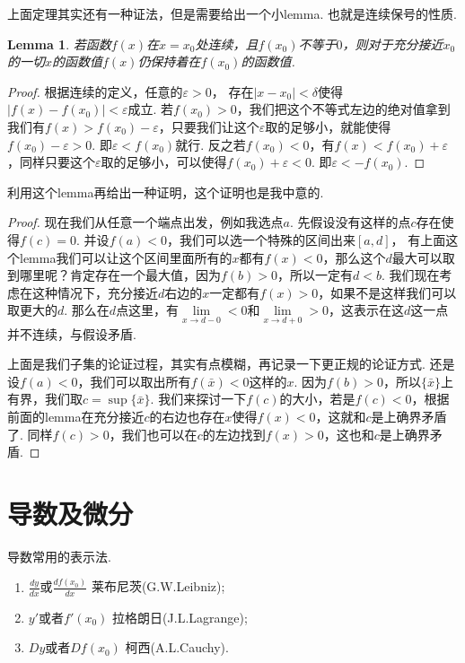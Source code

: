 \documentclass{article}
\newtheorem{lemma}[theorem]{Lemma}
\begin{document}
上面定理其实还有一种证法，但是需要给出一个小lemma. 也就是连续保号的性质.

\begin{lemma}
若函数$f(x)$在$x=x_0$处连续，且$f(x_0)$不等于$0$，则对于充分接近$x_0$的一切$x$的函数值$f(x)$仍保持着在$f(x_0)$的函数值.
\end{lemma}

\begin{proof}
根据连续的定义，任意的$\varepsilon > 0$， 存在$|x-x_0| < \delta$使得$|f(x)-f(x_0)| < \varepsilon$成立. 若$f(x_0)>0$，我们把这个不等式左边的绝对值拿到我们有$f(x) > f(x_0) - \varepsilon$，只要我们让这个$\varepsilon$取的足够小，就能使得$f(x_0) - \varepsilon > 0$. 即$\varepsilon < f(x_0)$就行. 反之若$f(x_0) < 0$，有$f(x) < f(x_0) + \varepsilon$，同样只要这个$\varepsilon$取的足够小，可以使得$f(x_0) + \varepsilon < 0$. 即$\varepsilon < -f(x_0)$.
\end{proof}

利用这个lemma再给出一种证明，这个证明也是我中意的.

\begin{proof}
\rm 现在我们从任意一个端点出发，例如我选点$a$. 先假设没有这样的点$c$存在使得$f(c)=0$. 并设$f(a) < 0$，我们可以选一个特殊的区间出来$[a,d]$， 有上面这个lemma我们可以让这个区间里面所有的$x$都有$f(x)<0$，那么这个$d$最大可以取到哪里呢？肯定存在一个最大值，因为$f(b)>0$，所以一定有$d < b$. 我们现在考虑在这种情况下，充分接近$d$右边的$x$一定都有$f(x) > 0$，如果不是这样我们可以取更大的$d$. 那么在$d$点这里，有$\lim\limits_{x \rightarrow d-0} < 0$和$\lim\limits_{x \rightarrow d+0} > 0$，这表示在这$d$这一点并不连续，与假设矛盾.

上面是我们子集的论证过程，其实有点模糊，再记录一下更正规的论证方式. 还是设$f(a)<0$，我们可以取出所有$f(\bar{x}) < 0$这样的$x$. 因为$f(b) > 0$，所以$\{\bar{x}\}$上有界，我们取$c = \sup\{\bar{x}\}$. 我们来探讨一下$f(c)$的大小，若是$f(c) < 0$，根据前面的lemma在充分接近$c$的右边也存在$x$使得$f(x)<0$，这就和$c$是上确界矛盾了. 同样$f(c) >0$，我们也可以在$c$的左边找到$f(x)>0$，这也和$c$是上确界矛盾.
\end{proof}


\newpage
\section{导数及微分}

导数常用的表示法.

\begin{enumerate}
	\item $\frac{dy}{dx}$或$\frac{df(x_0)}{dx}$ 莱布尼茨(G.W.Leibniz);
	\item $y'$或者$f'(x_0)$ 拉格朗日(J.L.Lagrange);
	\item $Dy$或者$Df(x_0)$ 柯西(A.L.Cauchy).
\end{enumerate}
\end{document}
